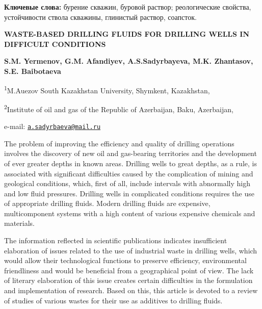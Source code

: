 {\bfseries Ключевые слова:} бурение скважин, буровой раствор; реологические
свойства, устойчивости ствола скважины, глинистый раствор, соапсток.
\begin{articleheader}

{\bfseries WASTE-BASED DRILLING FLUIDS FOR DRILLING WELLS IN DIFFICULT
CONDITIONS}

{\bfseries S.M. Yermenov, G.M. Afandiyev,
A.S.Sadyrbayeva\textsuperscript{\envelope }, M.K. Zhantasov, S.E. Baibotaeva}
\end{articleheader}
\begin{affiliation}

\textsuperscript{1}M.Auezov South Kazakhstan University, Shymkent,
Kazakhstan,

\textsuperscript{2}Institute of oil and gas of the Republic of
Azerbaijan, Baku, Azerbaijan,

e-mail: \href{mailto:a.sadyrbaeva@mail.ru}{\nolinkurl{a.sadyrbaeva@mail.ru}}
\end{affiliation}

The problem of improving the efficiency and quality of drilling
operations involves the discovery of new oil and gas-bearing territories
and the development of ever greater depths in known areas. Drilling
wells to great depths, as a rule, is associated with significant
difficulties caused by the complication of mining and geological
conditions, which, first of all, include intervals with abnormally high
and low fluid pressures. Drilling wells in complicated conditions
requires the use of appropriate drilling fluids. Modern drilling fluids
are expensive, multicomponent systems with a high content of various
expensive chemicals and materials.

The information reflected in scientific publications indicates
insufficient elaboration of issues related to the use of industrial
waste in drilling wells, which would allow their technological functions
to preserve efficiency, environmental friendliness and would be
beneficial from a geographical point of view. The lack of literary
elaboration of this issue creates certain difficulties in the
formulation and implementation of research. Based on this, this article
is devoted to a review of studies of various wastes for their use as
additives to drilling fluids.


